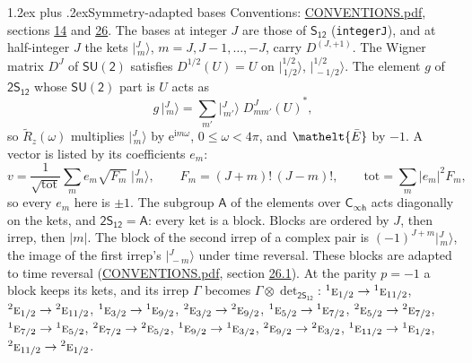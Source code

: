 \documentclass[10pt,a4paper]{article}
\makeatletter
\renewcommand\section{\@startsection{section}{1}{\z@}{-3ex plus -1ex minus -.2ex}%
  {1.2ex plus .2ex}{\normalfont\large\sffamily\bfseries\color{parttitle}}}
\numberwithin{equation}{section}
\newcommand{\eltfont}[1]{{\let\sigma\eltsigma\mathelt{#1}}}
\newcommand{\grp}[1]{\mathsf{#1}}
\newcommand{\irr}[1]{\text{\normalfont\scshape #1}}
\newcommand{\conjpair}[1]{{}^{#1}}
\newcommand{\elt}[1]{\eltfont{#1}}
\newcommand{\iunit}{\mathrm{i}}
\newcommand{\expe}{\mathrm{e}}
\newcommand{\irrJp}[2]{D^{(#1,#2)}}
\newcommand{\wignerD}[1]{D^{#1}}
\newcommand{\conj}[1]{{#1}^{*}}
\newcommand{\irrprod}{\otimes}
\newcommand{\jm}[2]{\bigl\lvert{}^{#1}_{\,#2}\bigr\rangle}
\newcommand{\barred}[1]{\bar{#1}}
\newcommand{\lift}[1]{\tilde{#1}}
\makeatother
\begin{document}
\section{Symmetry-adapted bases}\label{s:bases}
Conventions: \href{../../CONVENTIONS.pdf}{CONVENTIONS.pdf}, sections \href{../../../rotation/CONVENTIONS.pdf\#conv.14}{14} and \href{../../CONVENTIONS.pdf\#conv.26}{26}.
\leavevmode\label{n:index.m}\label{n:vector.ket}The bases at integer $J$ are those of \href{../../../rotation/data/pdf/S12.pdf}{$\grp{S_{12}}$} (\texttt{integerJ}), and at half-integer $J$ the kets $\jm{J}{m}$, $m = J, J-1, \dots, -J$, carry $\irrJp{J}{+1}$. \label{n:matrix.wigner}The Wigner matrix $\wignerD{J}$ of $\grp{SU(2)}$ satisfies $\wignerD{1/2}(U) = U$ on $\jm{1/2}{1/2}$, $\jm{1/2}{-1/2}$. The element $g$ of $\grp{2S_{12}}$ whose $\grp{SU(2)}$ part is $U$ acts as
\begin{equation}\label{e:action}g\,\jm{J}{m} = \sum_{m'} \jm{J}{m'}\; \conj{\wignerD{J}_{m m'}(U)},\end{equation}
so $\lift{R}_{z}(\omega)$ multiplies $\jm{J}{m}$ by $\expe^{\iunit m\omega}$, $0 \le \omega < 4\pi$, and $\elt{\barred{E}}$ by $-1$. \label{n:index.ketcoefficient}\label{n:vector.basis.symmetry}\label{n:index.ketweight}\label{n:index.total}A vector is listed by its coefficients $e_m$:
\begin{equation}\label{e:ket}v = \frac{1}{\sqrt{\mathrm{tot}}}\sum_m e_m\sqrt{F_m}\;\jm{J}{m},\qquad F_m = (J+m)!\,(J-m)!,\qquad \mathrm{tot} = \sum_m |e_m|^2F_m,\end{equation}
so every $e_m$ here is $\pm 1$.
\leavevmode\label{n:group.A}The subgroup $\grp{A}$ of the elements over $\grp{C_{\infty h}}$ acts diagonally on the kets, and $\grp{2S_{12}} = \grp{A}$: every ket is a block. Blocks are ordered by $J$, then irrep, then $|m|$. The block of the second irrep of a complex pair is $(-1)^{J+m}\jm{J}{m}$, the image of the first irrep's $\jm{J}{-m}$ under time reversal. These blocks are adapted to time reversal (\href{../../CONVENTIONS.pdf}{CONVENTIONS.pdf}, section \href{../../CONVENTIONS.pdf\#conv.26.1}{26.1}).
At the parity $p = -1$ a block keeps its kets, and its irrep $\Gamma$ becomes $\Gamma \irrprod \det_{\grp{2S_{12}}}$: $\conjpair{1}\irr{e}_{1/2} \to \conjpair{1}\irr{e}_{11/2}$, $\conjpair{2}\irr{e}_{1/2} \to \conjpair{2}\irr{e}_{11/2}$, $\conjpair{1}\irr{e}_{3/2} \to \conjpair{1}\irr{e}_{9/2}$, $\conjpair{2}\irr{e}_{3/2} \to \conjpair{2}\irr{e}_{9/2}$, $\conjpair{1}\irr{e}_{5/2} \to \conjpair{1}\irr{e}_{7/2}$, $\conjpair{2}\irr{e}_{5/2} \to \conjpair{2}\irr{e}_{7/2}$, $\conjpair{1}\irr{e}_{7/2} \to \conjpair{1}\irr{e}_{5/2}$, $\conjpair{2}\irr{e}_{7/2} \to \conjpair{2}\irr{e}_{5/2}$, $\conjpair{1}\irr{e}_{9/2} \to \conjpair{1}\irr{e}_{3/2}$, $\conjpair{2}\irr{e}_{9/2} \to \conjpair{2}\irr{e}_{3/2}$, $\conjpair{1}\irr{e}_{11/2} \to \conjpair{1}\irr{e}_{1/2}$, $\conjpair{2}\irr{e}_{11/2} \to \conjpair{2}\irr{e}_{1/2}$.
\end{document}
